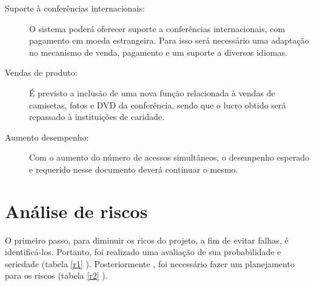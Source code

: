 \documentclass[letter]{article}
\begin{document}
\begin{description}

\item[Suporte à conferências internacionais:]  O sistema poderá oferecer suporte a conferências internacionais, com pagamento em moeda estrangeira. Para isso será necessário uma adaptação no mecanismo de venda, pagamento e um suporte a diversos idiomas.

\item[Vendas de produto:]  É previsto a inclusão de uma nova função relacionada à vendas de camisetas, fotos e DVD da conferência, sendo que o lucro obtido será repassado à instituições de caridade.

\item[Aumento desempenho:]  Com o aumento do número de acessos simultâneos, o desempenho esperado e requerido nesse documento deverá continuar o mesmo. 
\end{description}




\section{Análise de riscos}

O primeiro passo, para diminuir os ricos do projeto, a fim de evitar falhas, é identificá-los. Portanto, foi realizado uma avaliação de sua probabilidade e seriedade  (tabela \ref{r1} ). Posteriormente , foi necessário fazer um planejamento para os riscos (tabela \ref{r2} ).
 
\end{document}
